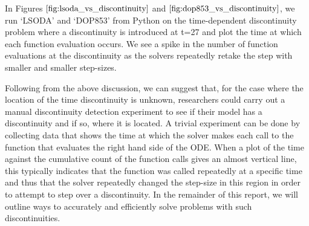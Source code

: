In Figures $\ref{fig:lsoda_vs_discontinuity}$ and $\ref{fig:dop853_vs_discontinuity}$, we run `LSODA' and `DOP853' from Python on the time-dependent discontinuity problem where a discontinuity is introduced at t=27 and plot the time at which each function evaluation occurs. We see a spike in the number of function evaluations at the discontinuity as the solvers repeatedly retake the step with smaller and smaller step-sizes.

Following from the above discussion, we can suggest that, for the case where the location of the time discontinuity is unknown, researchers could carry out a manual discontinuity detection experiment to see if their model has a discontinuity and if so, where it is located. A trivial experiment can be done by collecting data that shows the time at which the solver makes each call to the function that evaluates the right hand side of the ODE. When a plot of the time against the cumulative count of the function calls gives an almost vertical line, this typically indicates that the function was called repeatedly at a specific time and thus that the solver repeatedly changed the step-size in this region in order to attempt to step over a discontinuity. In the remainder of this report, we will outline ways to accurately and efficiently solve problems with such discontinuities.
